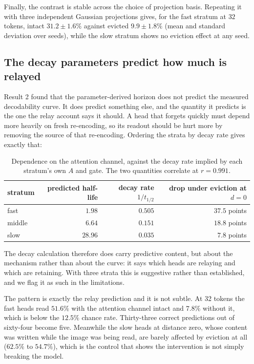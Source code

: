 \documentclass[11pt]{article}
\begin{document}
Finally, the contrast is stable across the choice of projection basis. Repeating
it with three independent Gaussian projections gives, for the fast stratum at
$32$ tokens, intact $31.2 \pm 1.6\%$ against evicted $9.9 \pm 1.8\%$ (mean and
standard deviation over seeds), while the slow stratum shows no eviction effect
at any seed.

\subsection{The decay parameters predict how much is relayed}

Result 2 found that the parameter-derived horizon does not predict the measured
decodability curve. It does predict something else, and the quantity it predicts
is the one the relay account says it should. A head that forgets quickly must
depend more heavily on fresh re-encoding, so its readout should be hurt more by
removing the source of that re-encoding. Ordering the strata by decay rate gives
exactly that:

\begin{table}[h]
\centering\small
\begin{tabular}{lrrr}
\toprule
stratum & predicted half-life & decay rate $1/t_{1/2}$ & drop under eviction at $d{=}0$ \\
\midrule
fast   & $1.98$  & $0.505$ & $37.5$ points \\
middle & $6.64$  & $0.151$ & $18.8$ points \\
slow   & $28.96$ & $0.035$ & $7.8$ points \\
\bottomrule
\end{tabular}
\caption{Dependence on the attention channel, against the decay rate implied by
each stratum's own $A$ and gate. The two quantities correlate at $r = 0.991$.}
\label{tab:dose}
\end{table}

The decay calculation therefore does carry predictive content, but about the
mechanism rather than about the curve: it says which heads are relaying and
which are retaining. With three strata this is suggestive rather than
established, and we flag it as such in the limitations.

The pattern is exactly the relay prediction and it is not subtle. At 32 tokens
the fast heads read $51.6\%$ with the attention channel intact and $7.8\%$
without it, which is below the $12.5\%$ chance rate. Thirty-three correct
predictions out of sixty-four become five. Meanwhile the slow heads at distance
zero, whose content was written while the image was being read, are barely
affected by eviction at all ($62.5\%$ to $54.7\%$), which is the control that
shows the intervention is not simply breaking the model.
\end{document}
